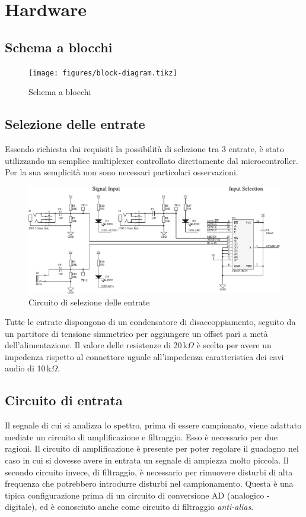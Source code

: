\chapter{Hardware}
\section{Schema a blocchi}

\begin{figure}[H] \centering \rmfamily
    \texttt{[image: figures/block-diagram.tikz]}
    \caption{Schema a blocchi}
\end{figure}

\section{Selezione delle entrate}
Essendo richiesta dai requisiti la possibilit\`a di selezione tra 3 entrate,
\`e stato utilizzando un semplice multiplexer controllato direttamente dal
microcontroller. Per la sua semplicit\`a non sono necessari particolari
osservazioni.

\begin{figure}[H] \centering
    \includegraphics[width=.9\linewidth]{figures/circuits/input-selection-v2.pdf}
    \caption{Circuito di selezione delle entrate \label{fig:input-selection-v2}}
\end{figure}

Tutte le entrate dispongono di un condensatore di disaccoppiamento, seguito da
un partitore di tensione simmetrico per aggiungere un offset pari a met\`a
dell'alimentazione. Il valore delle resistenze di 20\,k\(\Omega\) \`e scelto
per avere un impedenza rispetto al connettore uguale all'impedenza
caratteristica dei cavi audio di 10\,k\(\Omega\).

\section{Circuito di entrata}
Il segnale di cui si analizza lo spettro, prima di essere campionato, viene
adattato mediate un circuito di amplificazione e filtraggio. Esso \`e
necessario per due ragioni. Il circuito di amplificazione \`e presente per
poter regolare il guadagno nel caso in cui si dovesse avere in entrata un
segnale di ampiezza molto piccola. Il secondo circuito invece, di filtraggio,
\`e necessario per rimuovere disturbi di alta frequenza che potrebbero
introdurre disturbi nel campionamento. Questa \`e una tipica configurazione
prima di un circuito di conversione AD (analogico - digitale), ed \`e
conosciuto anche come circuito di filtraggio \emph{anti-alias}.

